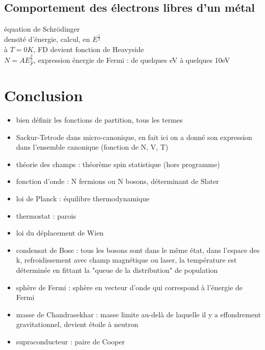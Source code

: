 \subsection{Comportement des électrons libres d'un métal}
équation de Schrödinger \\
densité d'énergie, calcul, en $E^\frac{1}{2}$ \\
à $T=0K$, FD devient fonction de Heavyside \\
$N=A E_F ^\frac{3}{2}$, expression énergie de Fermi : de quelques eV à quelques 10eV \\

\section*{Conclusion}


\begin{remarques} \begin{itemize} 
\item bien définir les fonctions de partition, tous les termes
\item Sackur-Tetrode dans micro-canonique, en fait ici on a donné son expression dans l'ensemble canonique (fonction de N, V, T)
\item théorie des champs : théorème spin statistique (hors programme)
\item fonction d'onde : N fermions ou N bosons, déterminant de Slater
\item loi de Planck : équilibre thermodynamique
\item thermostat : parois
\item loi du déplacement de Wien 
\item condensat de Bose : tous les bosons sont dans le même état, dans l'espace des k, refroidissement avec champ magnétique ou laser, la température est déterminée en fittant la "queue de la distribution" de population
\item sphère de Fermi : sphère en vecteur d'onde qui correspond à l'énergie de Fermi
\item masse de Chandrasekhar : masse limite au-delà de laquelle il y a effondrement gravitationnel, devient étoile à neutron
\item supraconducteur : paire de Cooper
\end{itemize} \end{remarques}
